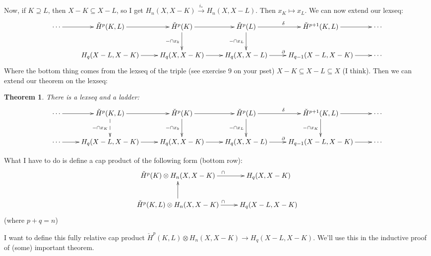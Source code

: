 \documentclass{amsart}
\theoremstyle{theorem}
\newtheorem{theorem}{Theorem}[section]
\theoremstyle{definition}
\newcommand\cHH{\check{H}}
\begin{document}
Now, if $K\supseteq L$, then $X-K\subseteq X-L$, so I get $H_n(X,X-K)\xrightarrow{i_\ast} H_n(X,X-L)$. Then $x_K\mapsto x_L$. We can now extend our lexseq:
\begin{equation*}
\xymatrix{
	\cdots\ar[r] & \cHH^p(K,L)\ar[r] & \cHH^p(K)\ar[r]\ar[d]_{-\cap x_k} & \cHH^p(L)\ar[r]^\delta\ar[d]_{-\cap x_L} & \cHH^{p+1}(K,L)\ar[r] & \cdots\\
	& H_q(X-L,X-K)\ar[r]& H_q(X,X-K)\ar[r] & H_q(X,X-L)\ar[r]^\partial & H_{q-1}(X-L,X-K)\ar[r] & \cdots
}
\end{equation*}
Where the bottom thing comes from the lexseq of the triple (see exercise 9 on your pset) $X-K\subseteq X-L\subseteq X$ (I think). Then we can extend our theorem on the lexseq:
\begin{theorem}
There is a lexseq and a ladder:
\begin{equation*}
\xymatrix{
	\cdots\ar[r] & \cHH^p(K,L)\ar[r]\ar@{-->}[d]_{-\cap x_{K}} & \cHH^p(K)\ar[r]\ar[d]_{-\cap x_k} & \cHH^p(L)\ar[r]^\delta\ar[d]_{-\cap x_L} & \cHH^{p+1}(K,L)\ar[r]\ar[d]_{-\cap x_{K}} & \cdots\\
	\cdots\ar[r] & H_q(X-L,X-K)\ar[r]& H_q(X,X-K)\ar[r] & H_q(X,X-L)\ar[r]^\partial & H_{q-1}(X-L,X-K)\ar[r] & \cdots
}
\end{equation*}
\end{theorem}
What I have to do is define a cap product of the following form (bottom row):
\begin{equation*}
\xymatrix{
	\cHH^p(K)\otimes H_n(X,X-K)\ar[r]^{\cap} & H_q(X,X-K)\\
	\cHH^p(K,L)\otimes H_n(X,X-K)\ar[u]\ar[r]^{\cap} & H_q(X-L,X-K)
}
\end{equation*}
(where $p+q=n$)

I want to define this fully relative cap product $\cHH^p(K,L)\otimes H_n(X,X-K)\to H_q(X-L,X-K)$. We'll use this in the inductive proof of (some) important theorem.
\end{document}
